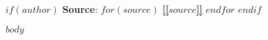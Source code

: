 \documentclass[
$if(fontsize)$
  $fontsize$,
$endif$
$if(lang)$
  $babel-lang$,
$endif$
$if(papersize)$
  $papersize$paper,
$endif$
$if(beamer)$
  ignorenonframetext,
$if(handout)$
  handout,
$endif$
$if(aspectratio)$
  aspectratio=$aspectratio$,
$endif$
$endif$
$for(classoption)$
  $classoption$$sep$,
$endfor$
]{$documentclass$}
\title{\textbf{\thecourse}\thelesson}
\newcommand\textulf[1]{{\NHLight\bfseries#1}}
\begin{document}
$if(author)$
\textbf{Source}:\thinspace
$for(source)$
{\href{http://taproot.shabang.cf/relay?request=$source$}{\tiny\textulf{[[}\textbf{$source$}\textulf{]]}}}\thinspace
$endfor$
$endif$

$body$
\end{document}
